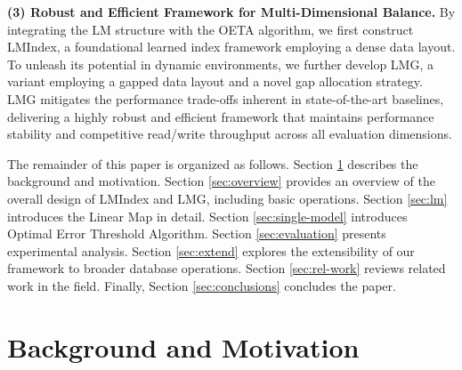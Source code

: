 
\textbf{(3) Robust and Efficient Framework for Multi-Dimensional Balance.} By integrating the LM structure with the OETA algorithm, we first construct LMIndex, a foundational learned index framework employing a dense data layout. To unleash its potential in dynamic environments, we further develop LMG, a variant employing a gapped data layout and a novel gap allocation strategy. LMG mitigates the performance trade-offs inherent in state-of-the-art baselines, delivering a highly robust and efficient framework that maintains performance stability and competitive read/write throughput across all evaluation dimensions.

The remainder of this paper is organized as follows. Section \ref{sec:back&moti} describes the background and motivation. Section \ref{sec:overview} provides an overview of the overall design of LMIndex and LMG, including basic operations. Section \ref{sec:lm} introduces the Linear Map in detail. Section \ref{sec:single-model} introduces Optimal Error Threshold Algorithm. Section \ref{sec:evaluation} presents experimental analysis. Section \ref{sec:extend} explores the extensibility of our framework to broader database operations. Section \ref{sec:rel-work} reviews related work in the field. Finally, Section \ref{sec:conclusions} concludes the paper.



\section{Background and Motivation}
\label{sec:back&moti}
